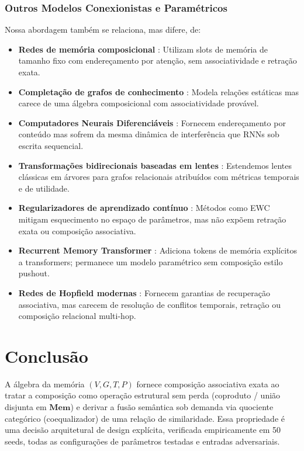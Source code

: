 \documentclass[11pt,a4paper]{article}
\theoremstyle{definition}
\begin{document}
\subsubsection{Outros Modelos Conexionistas e Param\'etricos}
Nossa abordagem tamb\'em se relaciona, mas difere, de:
\begin{itemize}
    \item \textbf{Redes de mem\'oria composicional} \cite{sukhbaatar2016end}: Utilizam slots de mem\'oria de tamanho fixo com endere\c{c}amento por aten\c{c}\~ao, sem associatividade e retra\c{c}\~ao exata.
    \item \textbf{Completa\c{c}\~ao de grafos de conhecimento} \cite{bordes2013translating}: Modela rela\c{c}\~oes est\'aticas mas carece de uma \'algebra composicional com associatividade prov\'avel.
    \item \textbf{Computadores Neurais Diferenci\'aveis} \cite{graves2016hybrid}: Fornecem endere\c{c}amento por conte\'udo mas sofrem da mesma din\^amica de interfer\^encia que RNNs sob escrita sequencial.
    \item \textbf{Transforma\c{c}\~oes bidirecionais baseadas em lentes} \cite{foster2007combinators}: Estendemos lentes cl\'assicas em \'arvores para grafos relacionais atribu\'idos com m\'etricas temporais e de utilidade.
    \item \textbf{Regularizadores de aprendizado cont\'inuo} \cite{kirpatrick2017overcoming}: M\'etodos como EWC mitigam esquecimento no espa\c{c}o de par\^ametros, mas n\~ao exp\~oem retra\c{c}\~ao exata ou composi\c{c}\~ao associativa.
    \item \textbf{Recurrent Memory Transformer} \cite{bulatov2022recurrent}: Adiciona tokens de mem\'oria expl\'icitos a transformers; permanece um modelo param\'etrico sem composi\c{c}\~ao estilo pushout.
    \item \textbf{Redes de Hopfield modernas} \cite{ramsauer2021hopfield}: Fornecem garantias de recupera\c{c}\~ao associativa, mas carecem de resolu\c{c}\~ao de conflitos temporais, retra\c{c}\~ao ou composi\c{c}\~ao relacional multi-hop.
\end{itemize}

\section{Conclus\~ao}\label{sec:conclusao}

A \'algebra da mem\'oria $(V, G, T, P)$ fornece composi\c{c}\~ao associativa exata ao tratar a composi\c{c}\~ao como opera\c{c}\~ao estrutural sem perda (coproduto / uni\~ao disjunta em $\mathbf{Mem}$) e derivar a fus\~ao sem\^antica sob demanda via quociente categ\'orico (coequalizador) de uma rela\c{c}\~ao de similaridade. Essa propriedade \'e uma decis\~ao arquitetural de design expl\'icita, verificada empiricamente em 50 seeds, todas as configura\c{c}\~oes de par\^ametros testadas e entradas adversariais.
\end{document}
